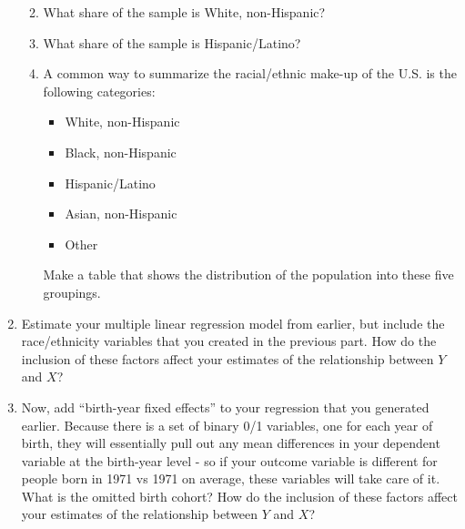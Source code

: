 \documentclass[11pt]{article}
\begin{document}
\begin{enumerate}
  \begin{enumerate}
  \def\labelenumii{\arabic{enumii}.}
  \item
    What share of the sample is White, non-Hispanic?
  \item
    What share of the sample is Hispanic/Latino?
  \item
    A common way to summarize the racial/ethnic make-up of the U.S. is
    the following categories:

    \begin{itemize}
    \item
      White, non-Hispanic
    \item
      Black, non-Hispanic
    \item
      Hispanic/Latino
    \item
      Asian, non-Hispanic
    \item
      Other
    \end{itemize}

    Make a table that shows the distribution of the population into
    these five groupings.
  \end{enumerate}
\item
  Estimate your multiple linear regression model from earlier, but
  include the race/ethnicity variables that you created in the previous
  part. How do the inclusion of these factors affect your estimates of
  the relationship between \(Y\) and \(X\)?
\item
  Now, add ``birth-year fixed effects'' to your regression that you
  generated earlier. Because there is a set of binary 0/1 variables, one
  for each year of birth, they will essentially pull out any mean
  differences in your dependent variable at the birth-year level - so if
  your outcome variable is different for people born in 1971 vs 1971 on
  average, these variables will take care of it. What is the omitted
  birth cohort? How do the inclusion of these factors affect your
  estimates of the relationship between \(Y\) and \(X\)?
\end{enumerate}
\end{document}
